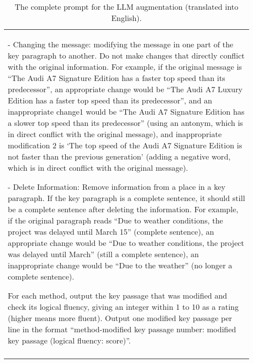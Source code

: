\begin{table*}
\begin{tabular}{|p{\textwidth}|}
\par - Changing the message: modifying the message in one part of the key paragraph to another. Do not make changes that directly conflict with the original information. For example, if the original message is “The Audi A7 Signature Edition has a faster top speed than its predecessor”, an appropriate change would be “The Audi A7 Luxury Edition has a faster top speed than its predecessor”, and an inappropriate change1 would be “The Audi A7 Signature Edition has a slower top speed than its predecessor” (using an antonym, which is in direct conflict with the original message), and inappropriate modification 2 is ‘The top speed of the Audi A7 Signature Edition is not faster than the previous generation’ (adding a negative word, which is in direct conflict with the original message).
\par - Delete Information: Remove information from a place in a key paragraph. If the key paragraph is a complete sentence, it should still be a complete sentence after deleting the information. For example, if the original paragraph reads “Due to weather conditions, the project was delayed until March 15” (complete sentence), an appropriate change would be “Due to weather conditions, the project was delayed until March” (still a complete sentence), an inappropriate change would be “Due to the weather” (no longer a complete sentence).
\par For each method, output the key passage that was modified and check its logical fluency, giving an integer within 1 to 10 as a rating (higher means more fluent). Output one modified key passage per line in the format “{method}-modified key passage {number}: {modified key passage} (logical fluency: {score})”.
\\ [5pt]
\\ [5pt]
\hline

\end{tabular}

\caption{\label{tab:prompt_en} The complete prompt for the LLM augmentation (translated into English).}
\end{table*}
